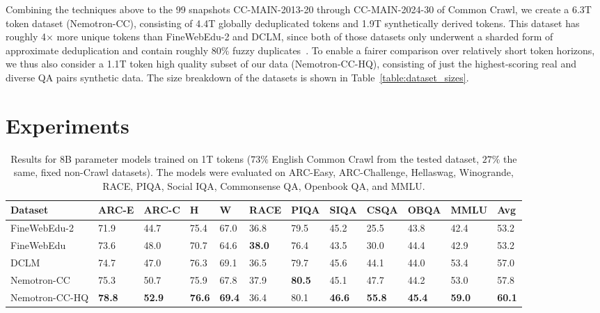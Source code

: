 \documentclass[11pt]{article}
\newcommand{\DCLM}{\textsc{DCLM}\xspace}
\newcommand{\Ours}{Nemotron-CC\xspace}
\begin{document}
Combining the techniques above to the 99 snapshots CC-MAIN-2013-20 through CC-MAIN-2024-30 of Common Crawl, we create a 6.3T token dataset (\Ours), consisting of 4.4T globally deduplicated tokens and 1.9T synthetically derived tokens. This dataset has roughly 4$\times$ more unique tokens than FineWebEdu-2 and \DCLM, since both of those datasets only underwent a sharded form of approximate deduplication and contain roughly $80\%$ fuzzy duplicates~\citep{fineweb-edu-discussion,li2024datacomp}. To enable a fairer comparison over relatively short token horizons, we thus also consider a 1.1T token high quality subset of our data (\Ours-HQ), consisting of just the highest-scoring real and diverse QA pairs synthetic data. The size breakdown of the datasets is shown in Table~\ref{table:dataset_sizes}.

\section{Experiments}

\begin{table}[!hbt]\small\centering
\begin{tabularx}{\textwidth}{Xlllllllllll}
\toprule
\textbf{Dataset}        & \textbf{ARC-E} & \textbf{ARC-C} & \textbf{H}    & \textbf{W}    & \textbf{RACE} & \textbf{PIQA} & \textbf{SIQA} & \textbf{CSQA} & \textbf{OBQA} & \textbf{MMLU} & \textbf{Avg}       \\ \midrule
FineWebEdu-2          & 71.9          & 44.7          & 75.4          & 67.0          & 36.8          & 79.5          & 45.2          & 25.5           & 43.8          & 42.4          & 53.2          \\
FineWebEdu            & 73.6          & 48.0          & 70.7          & 64.6          & \textbf{38.0} & 76.4          & 43.5          & 30.0           & 44.4          & 42.9          & 53.2          \\
\DCLM                 & 74.7          & 47.0          & 76.3          & 69.1          & 36.5          & 79.7          & 45.6          & 44.1           & 44.0          & 53.4          & 57.0          \\
\Ours                 & 75.3          & 50.7          & 75.9          & 67.8          & 37.9          & \textbf{80.5} & 45.1          & 47.7           & 44.2          & 53.0          & 57.8          \\
\Ours-HQ              & \textbf{78.8} & \textbf{52.9} & \textbf{76.6} & \textbf{69.4} & 36.4          & 80.1          & \textbf{46.6} & \textbf{55.8}  & \textbf{45.4} & \textbf{59.0} & \textbf{60.1} \\ \bottomrule
\end{tabularx}
\caption{Results for 8B parameter models trained on 1T tokens ($73\%$ English Common Crawl from the tested dataset, $27\%$ the same, fixed non-Crawl datasets). The models were evaluated on ARC-Easy, ARC-Challenge, Hellaswag, Winogrande, RACE, PIQA, Social IQA, Commonsense QA, Openbook QA, and MMLU.}
\label{table:main_detailed}
\end{table}
\end{document}
